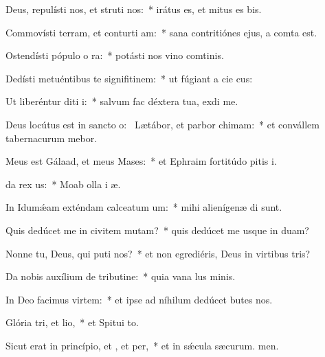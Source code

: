 \item Deus, repulísti nos, et struti nos:~* irátus es, et mitus es bis.
\item Commovísti terram, et conturti am:~* sana contritiónes ejus, a comta est.
\item Ostendísti pópulo o ra:~* potásti nos vino comtinis.
\item Dedísti metuéntibus te signifitinem:~* ut fúgiant a cie cus:
\item Ut liberéntur diti i:~* salvum fac déxtera tua,  exdi me.
\item Deus locútus est in sancto o:~\pscross{} Lætábor, et parbor chimam:~* et convállem tabernacurum mebor.
\item Meus est Gálaad, et meus  Mases:~* et Ephraim fortitúdo pitis i.
\item {}da rex us:~* Moab olla i æ.
\item In Idumǽam exténdam calceatum um:~* mihi alienígenæ di sunt.
\item Quis dedúcet me in civitem mutam?~* quis dedúcet me usque in duam?
\item Nonne tu, Deus, qui puti nos?~* et non egrediéris, Deus in virtibus tris?
\item Da nobis auxílium de tributine:~* quia vana lus minis.
\item In Deo facimus virtem:~* et ipse ad níhilum dedúcet butes nos.
\item Glória tri, et lio,~* et Spitui to.
\item Sicut erat in princípio, et , et per,~* et in sǽcula sæcurum. men.

